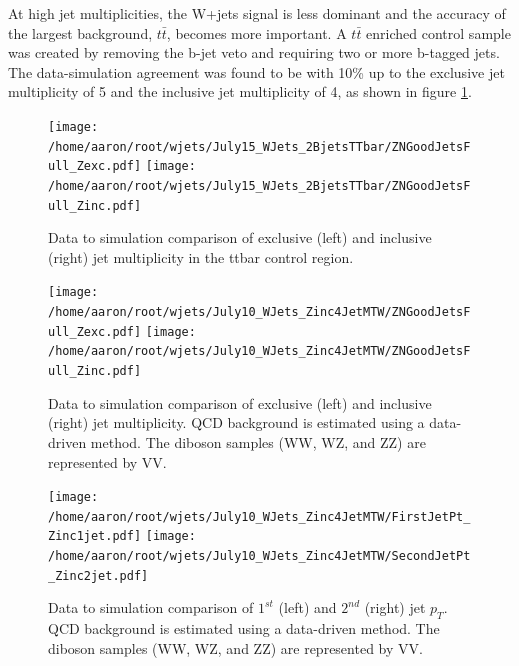 \documentclass[oneside, letterpaper, oldfontcommands]{memoir}
\begin{document}
\qquad At high jet multiplicities, the W+jets signal is less dominant and the accuracy of the largest background, $t\bar{t}$, becomes more important. A $t\bar{t}$ enriched control sample was created by removing the b-jet veto and requiring two or more b-tagged jets. The data-simulation agreement was found to be with 10\% up to the exclusive jet multiplicity of 5 and the inclusive jet multiplicity of 4, as shown in figure \ref{fig:ttbar_excinc}.


\begin{figure}[!Hhtbp]
\begin{center}
\texttt{[image: /home/aaron/root/wjets/July15\_WJets\_2BjetsTTbar/ZNGoodJetsFull\_Zexc.pdf]}
\texttt{[image: /home/aaron/root/wjets/July15\_WJets\_2BjetsTTbar/ZNGoodJetsFull\_Zinc.pdf]}
\end{center}
\caption{Data to simulation comparison of exclusive (left) and inclusive (right) jet multiplicity in the ttbar control region.}
\label{fig:ttbar_excinc}
\end{figure}


\begin{figure}[!Hhtbp]
\begin{center}
\texttt{[image: /home/aaron/root/wjets/July10\_WJets\_Zinc4JetMTW/ZNGoodJetsFull\_Zexc.pdf]}
\texttt{[image: /home/aaron/root/wjets/July10\_WJets\_Zinc4JetMTW/ZNGoodJetsFull\_Zinc.pdf]}
\end{center}
\caption{Data to simulation comparison of exclusive (left) and inclusive (right) jet multiplicity. QCD background is estimated using a data-driven method. The diboson samples (WW, WZ, and ZZ) are represented by VV.}
\label{mult}
\end{figure}

\begin{figure}[!Hhtbp]
\begin{center}
\texttt{[image: /home/aaron/root/wjets/July10\_WJets\_Zinc4JetMTW/FirstJetPt\_Zinc1jet.pdf]}
\texttt{[image: /home/aaron/root/wjets/July10\_WJets\_Zinc4JetMTW/SecondJetPt\_Zinc2jet.pdf]}\\
\end{center}
\caption{Data to simulation comparison of $1^{st}$ (left) and $2^{nd}$ (right) jet $p_{T}$. QCD background is estimated using a data-driven method. The diboson samples (WW, WZ, and ZZ) are represented by VV.}
\label{pt12}
\end{figure}
\end{document}
